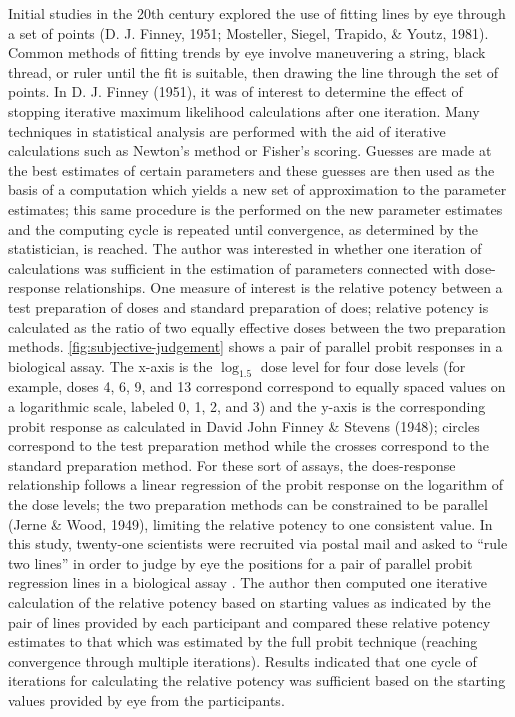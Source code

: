 \documentclass[print]{nuthesis}
\begin{document}
Initial studies in the 20th century explored the use of fitting lines by eye through a set of points (D. J. Finney, 1951; Mosteller, Siegel, Trapido, \& Youtz, 1981).
Common methods of fitting trends by eye involve maneuvering a string, black thread, or ruler until the fit is suitable, then drawing the line through the set of points.
In D. J. Finney (1951), it was of interest to determine the effect of stopping iterative maximum likelihood calculations after one iteration.
Many techniques in statistical analysis are performed with the aid of iterative calculations such as Newton's method or Fisher's scoring.
Guesses are made at the best estimates of certain parameters and these guesses are then used as the basis of a computation which yields a new set of approximation to the parameter estimates; this same procedure is the performed on the new parameter estimates and the computing cycle is repeated until convergence, as determined by the statistician, is reached.
The author was interested in whether one iteration of calculations was sufficient in the estimation of parameters connected with dose-response relationships.
One measure of interest is the relative potency between a test preparation of doses and standard preparation of does; relative potency is calculated as the ratio of two equally effective doses between the two preparation methods.
\cref{fig:subjective-judgement} shows a pair of parallel probit responses in a biological assay.
The x-axis is the \(\log_{1.5}\) dose level for four dose levels (for example, doses 4, 6, 9, and 13 correspond correspond to equally spaced values on a logarithmic scale, labeled 0, 1, 2, and 3) and the y-axis is the corresponding probit response as calculated in David John Finney \& Stevens (1948); circles correspond to the test preparation method while the crosses correspond to the standard preparation method.
For these sort of assays, the does-response relationship follows a linear regression of the probit response on the logarithm of the dose levels; the two preparation methods can be constrained to be parallel (Jerne \& Wood, 1949), limiting the relative potency to one consistent value.
In this study, twenty-one scientists were recruited via postal mail and asked to ``rule two lines'' in order to judge by eye the positions for a pair of parallel probit regression lines in a biological assay .
The author then computed one iterative calculation of the relative potency based on starting values as indicated by the pair of lines provided by each participant and compared these relative potency estimates to that which was estimated by the full probit technique (reaching convergence through multiple iterations).
Results indicated that one cycle of iterations for calculating the relative potency was sufficient based on the starting values provided by eye from the participants.
\end{document}
